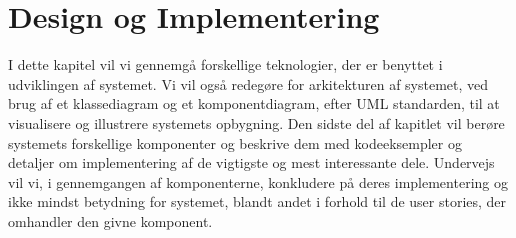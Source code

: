 \chapter{Design og Implementering}
I dette kapitel vil vi gennemgå forskellige teknologier, der er benyttet i udviklingen af systemet.
Vi vil også redegøre for arkitekturen af systemet, ved brug af et klassediagram og et komponentdiagram, efter UML standarden, til at visualisere og illustrere systemets opbygning.
Den sidste del af kapitlet vil berøre systemets forskellige komponenter og beskrive dem med kodeeksempler og detaljer om implementering af de vigtigste og mest interessante dele. 
Undervejs vil vi, i gennemgangen af komponenterne, konkludere på deres implementering og ikke mindst betydning for systemet, blandt andet i forhold til de user stories, der omhandler den givne komponent.



\newpage







